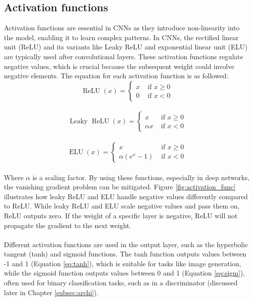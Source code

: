 \subsection{Activation functions}
Activation functions are essential in CNNs as they introduce non-linearity into the model, enabling it to learn complex patterns. In CNNs, the rectified linear unit (ReLU) and its variants like Leaky ReLU and exponential linear unit (ELU) are typically used after convolutional layers. These activation functions regulate negative values, which is crucial because the subsequent weight could involve negative elements. The equation for each activation function is as followed:
\\
\begin{equation}
	\operatorname{ReLU}(x)= \begin{cases}x & \text { if } x \geq 0 \\ 0 & \text { if } x<0\end{cases}
	\label{eq:relu}
\end{equation}
\\
\begin{equation}
	\text { Leaky } \operatorname{ReLU}(x)= \begin{cases}x & \text { if } x \geq 0 \\ \alpha x & \text { if } x<0\end{cases}
	\label{eq:leaky_relu}
\end{equation}
\\
\begin{equation}
	\operatorname{ELU}(x)= \begin{cases}x & \text { if } x \geq 0 \\ \alpha\left(e^x-1\right) & \text { if } x<0\end{cases}
	\label{eq:elu}
\end{equation}
\\
Where $\alpha$ is a scaling factor. By using these functions, especially in deep networks, the vanishing gradient problem can be mitigated. Figure \ref{fig:activation_func} illustrates how leaky ReLU and ELU handle negative values differently compared to ReLU. While leaky ReLU and ELU scale negative values and pass them on, ReLU outputs zero. If the weight of a specific layer is negative, ReLU will not propagate the gradient to the next weight.
\\\\
Different activation functions are used in the output layer, such as the hyperbolic tangent (tanh) and sigmoid functions. The tanh function outputs values between -1 and 1 (Equation \ref{eq:tanh}), which is suitable for tasks like image generation, while the sigmoid function outputs values between 0 and 1 (Equation \ref{eq:sigm}), often used for binary classification tasks, such as in a discriminator (discussed later in Chapter \ref{subsec:archi}).
